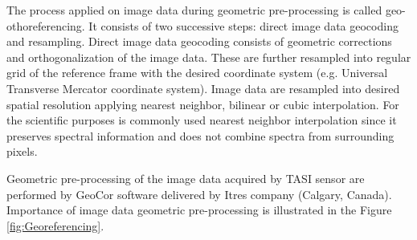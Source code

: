 The process applied on image data during geometric pre-processing is called geo-othoreferencing. It consists of two successive steps: direct image data geocoding and resampling. Direct image data geocoding consists of geometric corrections and orthogonalization of the image data. These are further resampled into regular grid of the reference frame with the desired coordinate system (e.g. Universal Transverse Mercator coordinate system). Image data are resampled into desired spatial resolution applying nearest neighbor, bilinear or cubic interpolation. For the scientific purposes is commonly used nearest neighbor interpolation since it preserves spectral information and does not combine spectra from surrounding pixels.

Geometric pre-processing of the image data acquired by TASI sensor are performed by GeoCor software \cite{software:GCSS} delivered by Itres company (Calgary, Canada). Importance of image data geometric pre-processing is illustrated in the Figure \ref{fig:Georeferencing}. 

